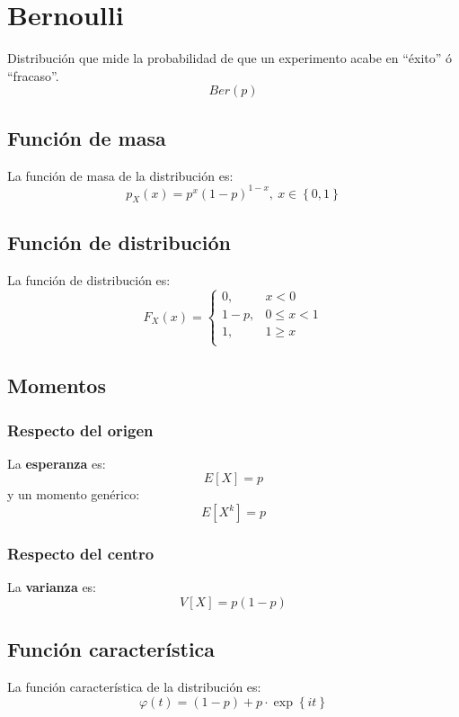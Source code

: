 \section{Bernoulli}
\label{sec:bernoulli}
Distribución que mide la probabilidad de que un experimento acabe en ``éxito'' ó 
``fracaso''. 
\[
Ber\left( p \right)
\]

\subsection{Función de masa}
La función de masa de la distribución es:
\[
p_X \left( x \right) = p^x \left( 1-p \right)^{1-x},\ x \in \left\{ 0, 1 \right\}
\]

\subsection{Función de distribución}
La función de distribución es:
\[
F_X\left( x \right) = \begin{cases}
    0, &x < 0\\ 
    1 - p, &0 \le x < 1\\
    1, &1 \ge x \\
\end{cases}
\]

\subsection{Momentos}

\subsubsection*{Respecto del origen}
La \textbf{esperanza} es: 
\[
    E\left[ X \right] = p
\]
y un momento genérico: 
\[
    E\left[ X^k \right] = p
\]
\subsubsection*{Respecto del centro}
La \textbf{varianza} es:
\[
    V\left[ X \right] = p\left( 1-p \right)
\]

\subsection{Función característica}
La función característica de la distribución es:
\[
\varphi\left( t \right) = \left( 1-p \right) + p \cdot \exp\left\{ it \right\}
\]


